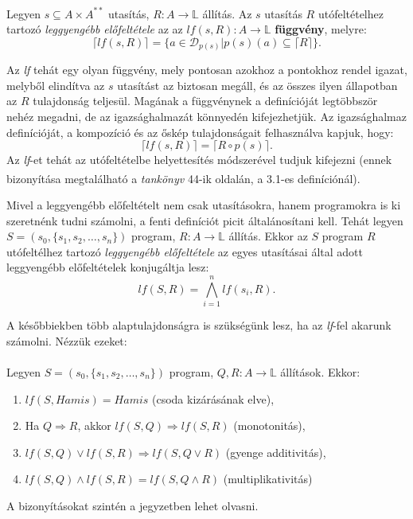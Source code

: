 \documentclass[12pt]{article}
\newcommand{\sut}{$s \subseteq A \times A^{**}$ }
\newcommand{\sprog}{$S = (s_0, \{s_1, s_2, \dots, s_n\})$ }
\begin{document}
\paragraph{}
Legyen \sut utasítás, $R: A \rightarrow \mathbb{L}$ állítás. Az $s$ utasítás $R$ utófeltételhez tartozó \textit{leggyengébb előfeltétele} az az $lf(s,R): A \rightarrow \mathbb{L}$ \textbf{függvény}, melyre:
$$ \lceil lf(s,R) \rceil = \{ a \in \mathcal{D}_{p(s)} | p(s)(a) \subseteq \lceil R \rceil \}. $$
\par Az \textit{lf} tehát egy olyan függvény, mely pontosan azokhoz a pontokhoz rendel igazat, melyből elindítva az $s$ utasítást az biztosan megáll, és az összes ilyen állapotban az $R$ tulajdonság teljesül.
Magának a függvénynek a definícióját legtöbbször nehéz megadni, de az igazsághalmazát könnyedén kifejezhetjük. Az igazsághalmaz definícióját, a kompozíció és az őskép tulajdonságait felhasználva kapjuk, hogy:
$$\lceil lf(s,R)\rceil = \lceil R \circ p(s) \rceil.$$
Az \textit{lf}-et tehát az utófeltételbe helyettesítés módszerével tudjuk kifejezni (ennek bizonyítása megtalálható a \textit{tankönyv}\textsuperscript{\cite{fothi_biblia}} 44-ik oldalán, a 3.1-es definíciónál). 

\par Mivel a leggyengébb előfeltételt nem csak utasításokra, hanem programokra is ki szeretnénk tudni számolni, a fenti definíciót picit általánosítani kell. Tehát legyen \sprog program, $R: A \rightarrow \mathbb{L}$ állítás. Ekkor az $S$ program $R$ utófeltélhez tartozó \textit{leggyengébb előfeltétele} az egyes utasításai által adott leggyengébb előfeltételek konjugáltja lesz:
$$ lf(S, R) = \bigwedge_{i=1}^n lf(s_i, R). $$


A későbbiekben több alaptulajdonságra is szükségünk lesz, ha az \textit{lf}-fel akarunk számolni. Nézzük ezeket:
\paragraph{}
Legyen \sprog program, $Q,R: A \rightarrow \mathbb{L}$ állítások. Ekkor:
\begin{enumerate}
	\item $lf(S, Hamis) = Hamis$ (csoda kizárásának elve),
	\item Ha $Q \Rightarrow R$, akkor $lf(S,Q) \Rightarrow lf(S,R)$ (monotonitás),
	\item $lf(S,Q) \lor lf(S,R) \Rightarrow lf(S, Q\lor R)$ (gyenge additivitás),
	\item $lf(S,Q) \land lf(S,R) = lf(S, Q\land R)$ (multiplikativitás)
\end{enumerate}
A bizonyításokat szintén a jegyzetben lehet olvasni.
\end{document}
